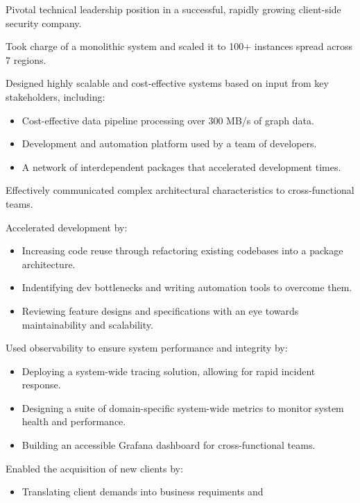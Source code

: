 
\begin{jobReflectizLead}
  \item Pivotal technical leadership position in a successful, rapidly growing client-side security company.
  \item Took charge of a monolithic system and scaled it to 100+ instances spread across 7 regions.
  \item Designed highly scalable and cost-effective systems based on input from key stakeholders, including:
    \begin{itemize}
      \item Cost-effective data pipeline processing over 300 MB/s of graph data.
      \item Development and automation platform used by a team of developers.
      \item A network of interdependent packages that accelerated
        development times.
    \end{itemize}
  \item Effectively communicated complex architectural
    characteristics to cross-functional teams.
  \item Accelerated development by:
    \begin{itemize}
      \item Increasing code reuse through refactoring existing
        codebases into a package architecture.
      \item Indentifying dev bottlenecks and writing automation tools
        to overcome them.
      \item Reviewing feature designs and specifications with an eye
        towards maintainability and scalability.
    \end{itemize}
  \item Used observability to ensure system performance and integrity by:
    \begin{itemize}
      \item Deploying a system-wide tracing solution, allowing for
        rapid incident response.
      \item Designing a suite of domain-specific system-wide metrics
        to monitor system health and performance.
      \item Building an accessible Grafana dashboard for cross-functional teams.
    \end{itemize}
  \item Enabled the acquisition of new clients by:
    \begin{itemize}
      \item Translating client demands into business requiments and

\end{itemize}
\end{jobReflectizLead}
